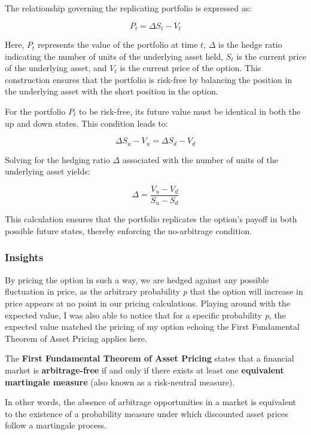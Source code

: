 \documentclass{article}
\begin{document}
    \medskip

    The relationship governing the replicating portfolio is expressed as:

    \begin{equation}
        \label{eq:delta_hedging_portfolio}
        P_t = \Delta S_t - V_t
    \end{equation}

    Here, \( P_t \) represents the value of the portfolio at time \( t \), \( \Delta \) is the hedge ratio indicating the number of units of the underlying asset held, \( S_t \) is the current price of the underlying asset, and \( V_t \) is the current price of the option. This construction ensures that the portfolio is risk-free by balancing the position in the underlying asset with the short position in the option.

    \medskip

    For the portfolio \( P_t \) to be risk-free, its future value must be identical in both the up and down states. This condition leads to:

    \[
        \Delta S_u - V_u = \Delta S_d - V_d
    \]

    Solving for the hedging ratio \( \Delta \) associated with the number of units of the underlying asset yields:

    \begin{equation}
        \label{eq:delta}
        \Delta = \frac{V_u - V_d}{S_u - S_d}
    \end{equation}

    This calculation ensures that the portfolio replicates the option's payoff in both possible future states, thereby enforcing the no-arbitrage condition.

    \subsubsection{Insights}

    By pricing the option in such a way, we are hedged against any possible fluctuation in price, as the arbitrary probability \emph{p} that the option will increase in price appears at no point in our pricing calculations.
    Playing around with the expected value, I was also able to notice that for a specific probability \emph{p}, the expected value matched the pricing of my option echoing the First Fundamental Theorem of Asset Pricing applies here.

    \begin{tcolorbox}[note, title=First Fundamental Theorem of Asset Pricing]
        The \textbf{First Fundamental Theorem of Asset Pricing} states that a financial market is \textbf{arbitrage-free} if and only if there exists at least one \textbf{equivalent martingale measure} (also known as a risk-neutral measure).

        In other words, the absence of arbitrage opportunities in a market is equivalent to the existence of a probability measure under which discounted asset prices follow a martingale process.
    \end{tcolorbox}
\end{document}
